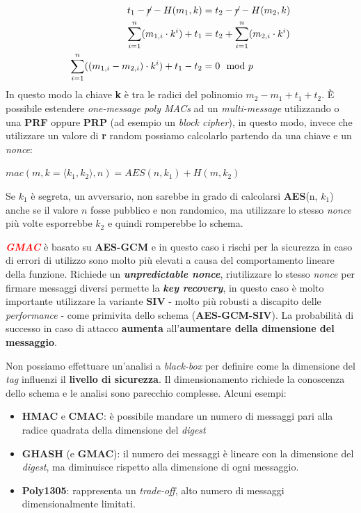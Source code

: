 \begin{flushleft}
    \begin{align*}
        t_1 - \cancel{r} - H(m_1, k) &= t_2 - \cancel{r} - H(m_2, k) \\
        \overset{n}{\underset{i=1}{\sum}}(m_{1,i} \cdot k^i) + t_1 &= t_2 + \overset{n}{\underset{i=1}{\sum}}(m_{2,i} \cdot k^i) \\
        \overset{n}{\underset{i=1}{\sum}}((m_{1, i} - m_{2, i}) \cdot k^i) + t_1 - t_2 &= 0 \mod p
    \end{align*}
    In questo modo la chiave \textbf{k} è tra le radici del polinomio $m_2 - m_1 + t_1 + t_2$. 
    \smallskip
    È possibile estendere \textit{one-message poly MACs} ad un \textit{multi-message} utilizzando o una \textbf{PRF} oppure \textbf{PRP} (ad esempio un \textit{block cipher}), in questo modo, invece che utilizzare un valore di \textbf{r} random possiamo calcolarlo partendo da una chiave e un \textit{nonce}:

    {\centering
        $mac(m, k = \langle k_1, k_2 \rangle, n) = AES(n, k_1) + H(m, k_2)$
    \par}

    Se $k_1$ è segreta, un avversario, non sarebbe in grado di calcolarsi \textbf{AES}(n, $k_1$) anche se il valore $n$ fosse pubblico e non randomico, ma utilizzare lo stesso \textit{nonce} più volte esporrebbe $k_2$ e quindi romperebbe lo schema.

    \medskip

    \textcolor{red}{\textbf{\textit{GMAC}}} è basato su \textbf{AES-GCM} e in questo caso i rischi per la sicurezza in caso di errori di utilizzo sono molto più elevati a causa del comportamento lineare della funzione. Richiede un \textbf{\textit{unpredictable nonce}}, riutilizzare lo stesso \textit{nonce} per firmare messaggi diversi permette la \textbf{\textit{key recovery}}, in questo caso è molto importante utilizzare la variante \textbf{SIV} - molto più robusti a discapito delle \textit{performance} - come primivita dello schema (\textbf{AES-GCM-SIV}). La probabilità di successo in caso di attacco \textbf{aumenta} all'\textbf{aumentare della dimensione del messaggio}.

    \smallskip

    Non possiamo effettuare un'analisi a \textit{black-box} per definire come la dimensione del \textit{tag} influenzi il \textbf{livello di sicurezza}. Il dimensionamento richiede la conoscenza dello schema e le analisi sono parecchio complesse. Alcuni esempi:
    \begin{itemize}[nosep]
        \item \textbf{HMAC} e \textbf{CMAC}: è possibile mandare un numero di messaggi pari alla radice quadrata della dimensione del \textit{digest}
        \item \textbf{GHASH} (e \textbf{GMAC}): il numero dei messaggi è lineare con la dimensione del \textit{digest}, ma diminuisce rispetto alla dimensione di ogni messaggio.
        \item \textbf{Poly1305}: rappresenta un \textit{trade-off}, alto numero di messaggi dimensionalmente limitati.
    \end{itemize}
\end{flushleft}